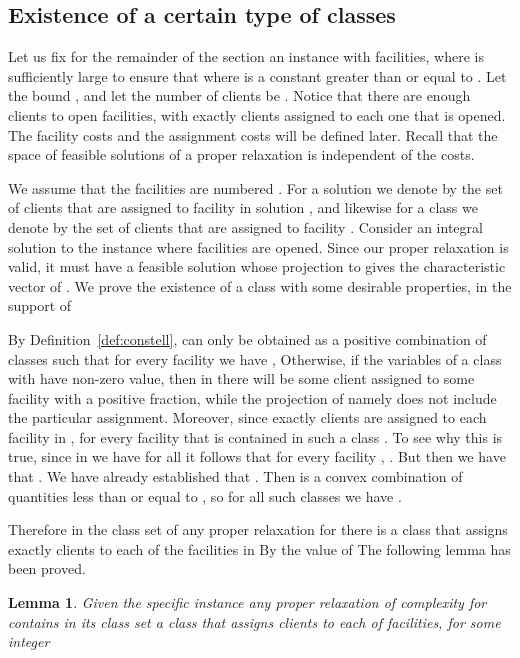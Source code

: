 \documentclass[11pt]{article}\usepackage{amsmath}
\newtheorem{lemma}{Lemma}[section]
\begin{document}
\subsection{Existence of a certain type of classes}

Let us fix for the remainder of the section 
an instance  with  facilities, where  is
sufficiently large to ensure  that   where
  is a
constant greater than or equal to  . Let the bound , and let
the number of  clients be . Notice that  there are enough clients
to open  facilities, with  exactly  clients assigned  to each
one that is opened. The  facility costs  and the assignment  costs will  be defined
later.  Recall  that the  space  of  feasible  solutions of  a  proper
relaxation is independent of the costs.

 We  assume that  the  facilities are  numbered
. 
For a solution  we  denote by 
the set  of clients  that are assigned  to facility   in solution
, and  likewise for a  class  we denote  by 
the set of clients that are assigned to facility .  
Consider  an  integral  solution    to  the  instance  where 
facilities   are opened. 
Since our proper  relaxation is valid, it must have   a feasible 
solution   whose projection to  gives the characteristic
vector of .  We prove the existence of a  class  with some desirable
properties, in the support of  

By Definition~\ref{def:constell},
 can only be obtained as a positive combination of classes  such that for
every    facility       we   have    , Otherwise,  if the variables  of a  class 
with  have  non-zero value,
then in  there will be  some client assigned to
some facility with a positive fraction, while the projection of  namely 
does  not include  the
particular  assignment.  
Moreover,  since exactly  clients are  assigned to each
facility in  ,   for every facility 
that   is  contained   in  such   a  class     . To see why this  is true, 
since in   we have  for all    it follows  that for every facility ,
 .  
But  then  we have  that
.  We have already established   that . Then  is  a convex combination
of quantities less than or equal to , so for all such classes 
we have .


Therefore
in the class set of any proper relaxation for  there is 
a class  that assigns exactly  clients to each of  the
facilities in  By the value of  
  The following
lemma has been proved. 


\iffalse     --- old version 
\begin{lemma}
There is a class  that is contained in the class set of the proper
relaxation, that assigns  clients to each of  for some facilities.
\end{lemma}
\fi 
\begin{lemma}   \label{lemma:existence} 
Given the specific instance  any proper relaxation  of complexity
 for  contains in its class set a class 
 that assigns  clients to each of  facilities, for some
integer   
\end{lemma}
\end{document}
